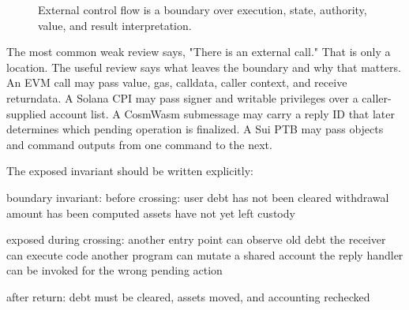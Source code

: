 \begin{figure}[htbp]
\centering
{}
\caption{External control flow is a boundary over execution, state, authority, value, and result interpretation.}
\end{figure}

The most common weak review says, "There is an external call." That is only a location. The useful review says what leaves the boundary and why that matters. An EVM call may pass value, gas, calldata, caller context, and receive returndata. A Solana CPI may pass signer and writable privileges over a caller-supplied account list. A CosmWasm submessage may carry a reply ID that later determines which pending operation is finalized. A Sui PTB may pass objects and command outputs from one command to the next.

The exposed invariant should be written explicitly:

\begin{codeblock}
boundary invariant:
    before crossing:
        user debt has not been cleared
        withdrawal amount has been computed
        assets have not yet left custody

    exposed during crossing:
        another entry point can observe old debt
        the receiver can execute code
        another program can mutate a shared account
        the reply handler can be invoked for the wrong pending action

    after return:
        debt must be cleared, assets moved, and accounting rechecked
\end{codeblock}

